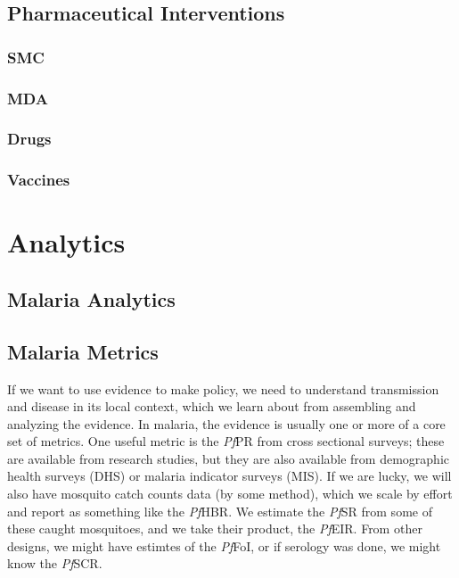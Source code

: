 \documentclass[
]{book}
\begin{document}
\chapter{Pharmaceutical Interventions}\label{pharmaceutical-interventions}

\section{SMC}\label{smc}

\section{MDA}\label{mda}

\section{Drugs}\label{drugs}

\section{Vaccines}\label{vaccines}

\part{Analytics}\label{part-analytics}

\chapter{Malaria Analytics}\label{malaria-analytics}

\chapter{Malaria Metrics}\label{malaria-metrics}

If we want to use evidence to make policy, we need to understand transmission and disease in its local context, which we learn about from assembling and analyzing the evidence. In malaria, the evidence is usually one or more of a core set of metrics. One useful metric is the \emph{Pf}PR from cross sectional surveys; these are available from research studies, but they are also available from demographic health surveys (DHS) or malaria indicator surveys (MIS). If we are lucky, we will also have mosquito catch counts data (by some method), which we scale by effort and report as something like the \emph{Pf}HBR. We estimate the \emph{Pf}SR from some of these caught mosquitoes, and we take their product, the \emph{Pf}EIR. From other designs, we might have estimtes of the \emph{Pf}FoI, or if serology was done, we might know the \emph{Pf}SCR.
\end{document}
